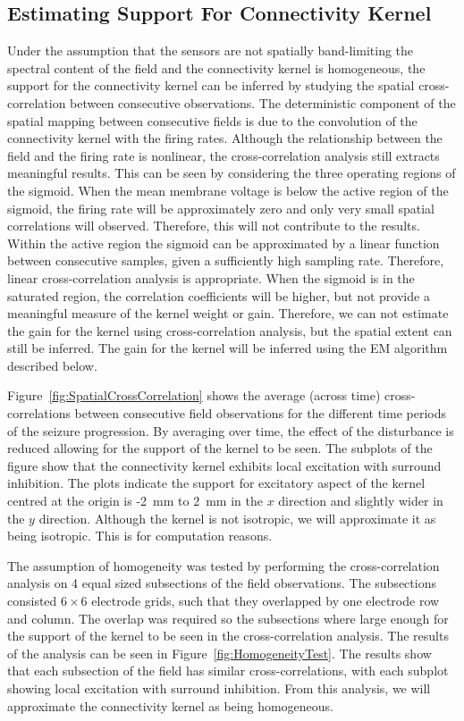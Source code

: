 \documentclass[]{article}
\begin{document}
\subsection{Estimating Support For Connectivity Kernel}
Under the assumption that the sensors are not spatially band-limiting the spectral content of the field and the connectivity kernel is homogeneous, the support for the connectivity kernel can be inferred by studying the spatial cross-correlation between consecutive observations. The deterministic component of the spatial mapping between consecutive fields is due to the convolution of the connectivity kernel with the firing rates. Although the relationship between the field and the firing rate is nonlinear, the cross-correlation analysis still extracts meaningful results. This can be seen by considering the three operating regions of the sigmoid. When the mean membrane voltage is below the active region of the sigmoid, the firing rate will be approximately zero and only very small spatial correlations will observed. Therefore, this will not contribute to the results. Within the active region the sigmoid can be approximated by a linear function between consecutive samples, given a sufficiently high sampling rate. Therefore, linear cross-correlation analysis is appropriate. When the sigmoid is in the saturated region, the correlation coefficients will be higher, but not provide a meaningful measure of the kernel weight or gain. Therefore, we can not estimate the gain for the kernel using cross-correlation analysis, but the spatial extent can still be inferred. The gain for the kernel will be inferred using the EM algorithm described below.

Figure~\ref{fig:SpatialCrossCorrelation} shows the average (across time) cross-correlations between consecutive field observations for the different time periods of the seizure progression. By averaging over time, the effect of the disturbance is reduced allowing for the support of the kernel to be seen. The subplots of the figure show that the connectivity kernel exhibits local excitation with surround inhibition. The plots indicate the support for excitatory aspect of the kernel centred at the origin is -2~mm to 2~mm in the $x$ direction and slightly wider in the $y$ direction. Although the kernel is not isotropic, we will approximate it as being isotropic. This is for computation reasons.

The assumption of homogeneity was tested by performing the cross-correlation analysis on 4 equal sized subsections of the field observations. The subsections consisted $6\times6$ electrode grids, such that they overlapped by one electrode row and column. The overlap was required so the subsections where large enough for the support of the kernel to be seen in the cross-correlation analysis. The results of the analysis can be seen in Figure~\ref{fig:HomogeneityTest}. The results show that each subsection of the field has similar cross-correlations, with each subplot showing local excitation with surround inhibition. From this analysis, we will approximate the connectivity kernel as being homogeneous.
\end{document}
